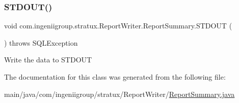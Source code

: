 \subsubsection{\texorpdfstring{S\+T\+D\+O\+U\+T()}{STDOUT()}}
{\footnotesize\ttfamily void com.\+ingeniigroup.\+stratux.\+Report\+Writer.\+Report\+Summary.\+S\+T\+D\+O\+UT (\begin{DoxyParamCaption}{ }\end{DoxyParamCaption}) throws S\+Q\+L\+Exception}

Write the data to S\+T\+D\+O\+UT 

The documentation for this class was generated from the following file\+:\begin{DoxyCompactItemize}
\item 
main/java/com/ingeniigroup/stratux/\+Report\+Writer/\hyperlink{_report_summary_8java}{Report\+Summary.\+java}\end{DoxyCompactItemize}

